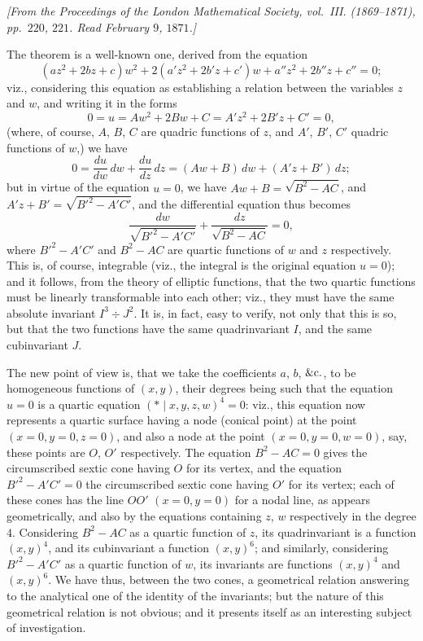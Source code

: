 \documentclass[11pt,a4paper]{article}
\begin{document}
\begin{center}
\textit{[From the Proceedings of the London Mathematical Society, vol.\ III.
(1869--1871), pp.\ $220$, $221$. Read February $9$, $1871$.]}
\end{center}

\medskip

The theorem is a well-known one, derived from the equation
\[
(a z^2 + 2 b z + c) w^2 + 2 (a' z^2 + 2 b' z + c') w
+ a'' z^2 + 2 b'' z + c'' = 0;
\]
viz., considering this equation as establishing a relation between the
variables $z$ and $w$, and writing it in the forms
\[
0 = u = A w^2 + 2 B w + C = A' z^2 + 2 B' z + C' = 0,
\]
(where, of course, $A$, $B$, $C$ are quadric functions of $z$, and $A'$,
$B'$, $C'$ quadric functions of $w$,) we have
\[
0 = \frac{du}{dw}\, dw + \frac{du}{dz}\, dz = (A w + B)\, dw + (A' z + B')\, dz;
\]
but in virtue of the equation $u = 0$, we have $A w + B = \sqrt{B^2 - AC}$,
and $A' z + B' = \sqrt{B'^2 - A'C'}$, and the differential equation thus
becomes
\[
\frac{dw}{\sqrt{B'^2 - A'C'}} + \frac{dz}{\sqrt{B^2 - AC}} = 0,
\]
where $B'^2 - A'C'$ and $B^2 - AC$ are quartic functions of $w$ and $z$
respectively. This is, of course, integrable (viz., the integral is the
original equation $u = 0$); and it follows, from the theory of elliptic
functions, that the two quartic functions must be linearly transformable
into each other; viz., they must have the same absolute invariant
$I^3 \div J^2$. It is, in fact, easy to verify, not only that this is so,
but that the two functions have the same quadrinvariant $I$, and the same
cubinvariant $J$.

\medskip

The new point of view is, that we take the coefficients $a$, $b$,
$\&{\rm c}.$, to be homogeneous functions of $(x, y)$, their degrees being
such that the equation $u = 0$ is a quartic equation
$(*\!\mid\! x, y, z, w)^4 = 0$: viz., this equation now represents a
quartic surface having a node (conical point) at the point
$(x = 0, y = 0, z = 0)$, and also a node at the point $(x = 0, y = 0,
w = 0)$, say, these points are $O$, $O'$ respectively. The equation
$B^2 - AC = 0$ gives the circumscribed sextic cone having $O$ for its
vertex, and the equation $B'^2 - A'C' = 0$ the circumscribed sextic cone
having $O'$ for its vertex; each of these cones has the line $O O'$
$(x = 0, y = 0)$ for a nodal line, as appears geometrically, and also by
the equations containing $z$, $w$ respectively in the degree $4$.
Considering $B^2 - AC$ as a quartic function of $z$, its quadrinvariant is
a function $(x, y)^4$, and its cubinvariant a function $(x, y)^6$; and
similarly, considering $B'^2 - A'C'$ as a quartic function of $w$, its
invariants are functions $(x, y)^4$ and $(x, y)^6$. We have thus, between
the two cones, a geometrical relation answering to the analytical one of
the identity of the invariants; but the nature of this geometrical
relation is not obvious; and it presents itself as an interesting subject
of investigation.
\end{document}
